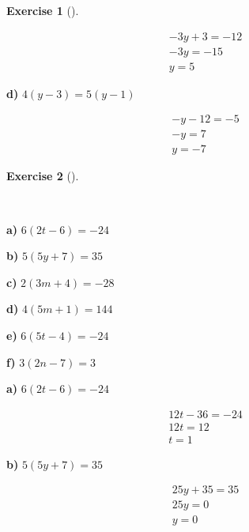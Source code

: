 \documentclass[
  letterpaper,
  DIV=11,
  numbers=noendperiod]{scrreprt}
\theoremstyle{definition}
\newtheorem{exercise}{Exercise}[chapter]
\theoremstyle{remark}
\begin{document}
\begin{exercise}[]
\begin{tcolorbox}
\begin{align*}
-3y + 3 = -12 \\ -3y = -15 \\ y = 5
\end{align*}

\textbf{d)} \(\displaystyle 4(y - 3) = 5(y - 1)\)

\begin{align*}
-y - 12 = -5 \\ -y = 7 \\ y = -7
\end{align*}

\end{tcolorbox}

\end{exercise}

\begin{exercise}[]\protect\hypertarget{exr-u5-9}{}\label{exr-u5-9}

~

\textbf{a)} \(\displaystyle 6(2t - 6) = -24\)

\textbf{b)} \(\displaystyle 5(5y + 7) = 35\)

\textbf{c)} \(\displaystyle 2(3m + 4) = -28\)

\textbf{d)} \(\displaystyle 4(5m + 1) = 144\)

\textbf{e)} \(\displaystyle 6(5t - 4) = -24\)

\textbf{f)} \(\displaystyle 3(2n - 7) = 3\)

\begin{tcolorbox}[enhanced jigsaw, opacitybacktitle=0.6, coltitle=black, arc=.35mm, colframe=quarto-callout-tip-color-frame, colback=white, bottomrule=.15mm, left=2mm, colbacktitle=quarto-callout-tip-color!10!white, titlerule=0mm, opacityback=0, title=\textcolor{quarto-callout-tip-color}{\faLightbulb}\hspace{0.5em}{🔍 View Solutions}, leftrule=.75mm, breakable, rightrule=.15mm, bottomtitle=1mm, toptitle=1mm, toprule=.15mm]

\textbf{a)} \(\displaystyle 6(2t - 6) = -24\)

\begin{align*}
12t - 36 = -24 \\ 12t = 12 \\ t = 1
\end{align*}

\textbf{b)} \(\displaystyle 5(5y + 7) = 35\)

\begin{align*}
25y + 35 = 35 \\ 25y = 0 \\ y = 0
\end{align*}


\end{tcolorbox}
\end{exercise}
\end{document}
